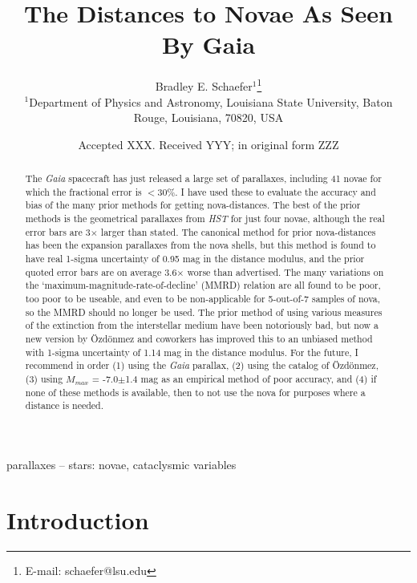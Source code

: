 \documentclass[a4paper,fleqn,usenatbib]{mnras}
\title[Nova Distances With Gaia DR2]{The Distances to Novae As Seen By Gaia}
\author[B. E. Schaefer]{
Bradley E. Schaefer$^{1}$\thanks{E-mail: schaefer@lsu.edu}
\\
$^{1}$Department of Physics and Astronomy, Louisiana State University, Baton Rouge, Louisiana, 70820, USA\\
}
\date{Accepted XXX. Received YYY; in original form ZZZ}
\begin{document}
\label{firstpage}
\pagerange{\pageref{firstpage}--\pageref{lastpage}}
\maketitle

\begin{abstract}

The {\it Gaia} spacecraft has just released a large set of parallaxes, including 41 novae for which the fractional error is $<$30\%.  I have used these to evaluate the accuracy and bias of the many prior methods for getting nova-distances.  The best of the prior methods is the geometrical parallaxes from {\it HST} for just four novae, although the real error bars are 3$\times$ larger than stated.  The canonical method for prior nova-distances has been the expansion parallaxes from the nova shells, but this method is found to have real 1-sigma uncertainty of 0.95 mag in the distance modulus, and the prior quoted error bars are on average 3.6$\times$ worse than advertised.  The many variations on the `maximum-magnitude-rate-of-decline' (MMRD) relation are all found to be poor, too poor to be useable, and even to be non-applicable for 5-out-of-7 samples of nova, so the MMRD should no longer be used.  The prior method of using various measures of the extinction from the interstellar medium have been notoriously bad, but now a new version by \"{O}zd\"{o}nmez and coworkers has improved this to an unbiased method with 1-sigma uncertainty of 1.14 mag in the distance modulus.  For the future, I recommend in order (1) using the {\it Gaia} parallax, (2) using the catalog of \"{O}zd\"{o}nmez, (3) using $M_{max}$ = -7.0$\pm$1.4 mag as an empirical method of poor accuracy, and (4) if none of these methods is available, then to not use the nova for purposes where a distance is needed.
 
\end{abstract}

\begin{keywords}
parallaxes -- stars: novae, cataclysmic variables 
\end{keywords}



\section{Introduction}
\end{document}
